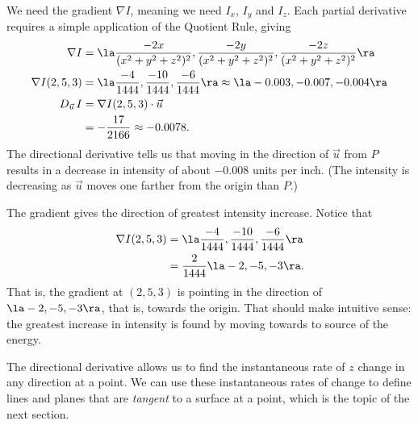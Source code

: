 {We need the gradient $\nabla I$, meaning we need $I_x$, $I_y$ and $I_z$. Each partial derivative requires a simple application of the Quotient Rule, giving
\begin{align*}
\nabla I &= \la \frac{-2x}{(x^2+y^2+z^2)^2},\frac{-2y}{(x^2+y^2+z^2)^2},\frac{-2z}{(x^2+y^2+z^2)^2}\ra\\
\nabla I(2,5,3) &= \la \frac{-4}{1444},\frac{-10}{1444},\frac{-6}{1444}\ra \approx \la -0.003,-0.007,-0.004\ra\\
D_{\vec u\,}I &= \nabla I(2,5,3)\cdot \vec u\\
					&= -\frac{17}{2166} \approx -0.0078.
\end{align*}
The directional derivative tells us that moving in the direction of $\vec u$ from $P$ results in a decrease in intensity of about $-0.008$ units per inch. (The intensity is decreasing as $\vec u$ moves one farther from the origin than $P$.)

The gradient gives the direction of greatest intensity increase. Notice that 
\begin{align*}
\nabla I(2,5,3) &= \la \frac{-4}{1444},\frac{-10}{1444},\frac{-6}{1444}\ra\\
			&= \frac{2}{1444}\la -2,-5,-3\ra.
\end{align*}
That is, the gradient at $(2,5,3)$ is pointing in the direction of $\la -2,-5,-3\ra$, that is, towards the origin. That should make intuitive sense: the greatest increase in intensity is found by moving towards to source of the energy.}

The directional derivative allows us to find the instantaneous rate of $z$ change in any direction at a point. We can use these instantaneous rates of change to define lines and planes that are \emph{tangent} to a surface at a point, which is the topic of the next section.

